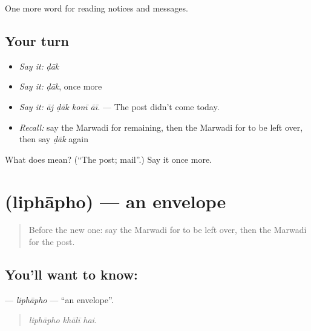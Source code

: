 \begin{grammarlens}[title={What you've built}]
One more word for reading notices and messages.
\end{grammarlens}

\subsection*{Your turn}
\begin{itemize}
\raggedright
  \item \emph{Say it:} \emph{ḍāk}
  \item \emph{Say it:} \emph{ḍāk}, once more
  \item \emph{Say it:} \emph{āj ḍāk konī āī.} — The post didn't come today.
  \item \emph{Recall:} say the Marwadi for remaining, then the Marwadi for to be left over, then say \emph{ḍāk} again
\end{itemize}

\begin{tcolorbox}[breakable,colback=teal!4,colframe=teal!35!black,title={Before you move on}]
What does  mean? (\textquotedblleft{}The post; mail\textquotedblright{}.) Say it once more.
\end{tcolorbox}
\section[\texorpdfstring{\mw{लिफाफो} (liphāpho)}{लिफाफो (liphāpho)}]{ (liphāpho) — an envelope}

\label{lesson:MW-C196-liphapho}



\begin{quote}
Before the new one: say the Marwadi for to be left over, then the Marwadi for the post.
\end{quote}

\subsection*{You'll want to know: }
\textbf{} — \emph{liphāpho} — \textquotedblleft{}an envelope\textquotedblright{}.

\begin{quote}
  
\end{quote}

\begin{quote}
\emph{liphāpho khālī hai.}
\end{quote}


